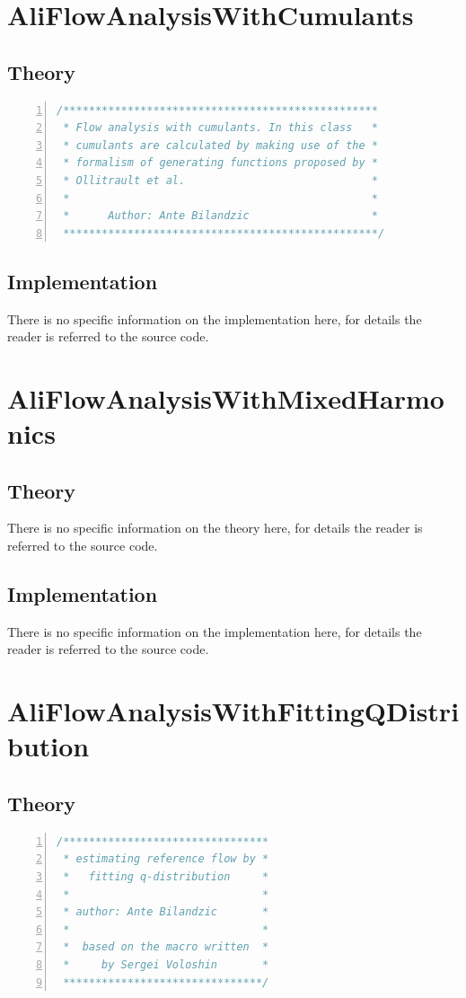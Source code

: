 \documentclass[a4paper]{book}
\numberwithin{equation}{subsection}
\begin{document}
\section{AliFlowAnalysisWithCumulants}
\subsection{Theory}
\begin{lstlisting}[language=C, numbers=left]
/************************************************* 
 * Flow analysis with cumulants. In this class   *
 * cumulants are calculated by making use of the *
 * formalism of generating functions proposed by *
 * Ollitrault et al.                             *
 *                                               * 
 *      Author: Ante Bilandzic                   * 
 *************************************************/ \end{lstlisting}

\subsection{Implementation}
There is no specific information on the implementation here, for details the reader is referred to the source code.
\section{AliFlowAnalysisWithMixedHarmonics}
\subsection{Theory}
There is no specific information on the theory here, for details the reader is referred to the source code.
\subsection{Implementation}
There is no specific information on the implementation here, for details the reader is referred to the source code.

\section{AliFlowAnalysisWithFittingQDistribution}
\subsection{Theory}
\begin{lstlisting}[language=C, numbers=left]
/******************************** 
 * estimating reference flow by *
 *   fitting q-distribution     * 
 *                              *
 * author: Ante Bilandzic       * 
 *                              *  
 *  based on the macro written  *
 *     by Sergei Voloshin       *
 *******************************/  \end{lstlisting}
\end{document}
